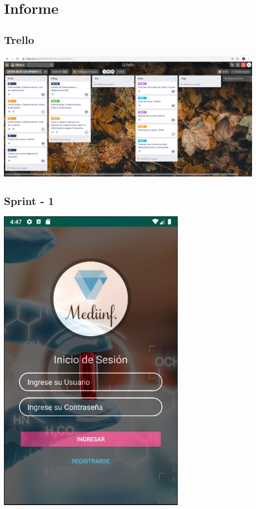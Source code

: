 
\chapter{Informe}

\section{Trello}

\begin{center}
	\includegraphics[width=1.20\textwidth]{img/Captura1}\par\vspace{2cm}
\end{center}

\section{Sprint - 1}	


	\includegraphics[width=0.70\textwidth]{img/Captura2}\par\vspace{2cm}
	